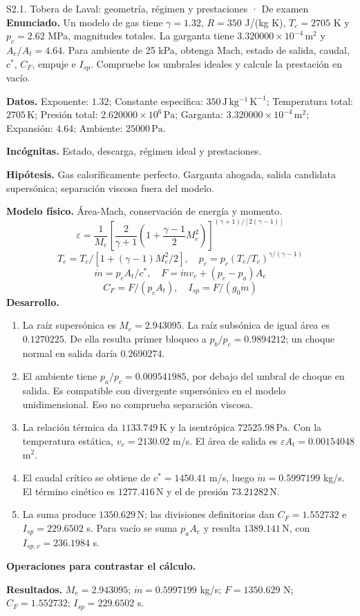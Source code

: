 \begin{studiumworked}{S2.1. Tobera de Laval: geometría, régimen y prestaciones · De examen}
\textbf{Enunciado.} Un modelo de gas tiene $\gamma=1.32$, $R=350$ J/(kg K), $T_c=2705$ K y $p_c=2.62$ MPa, magnitudes totales. La garganta tiene $3.320000\times10^{-4}\,\mathrm{m^2}$ y $A_e/A_t=4.64$. Para ambiente de 25 kPa, obtenga Mach, estado de salida, caudal, $c^*$, $C_F$, empuje e $I_{sp}$. Compruebe los umbrales ideales y calcule la prestación en vacío.

\textbf{Datos.} Exponente: $1.32$; Constante específica: $350\,\mathrm{J\,kg^{-1}\,K^{-1}}$; Temperatura total: $2705\,\mathrm{K}$; Presión total: $2.620000\times10^{6}\,\mathrm{Pa}$; Garganta: $3.320000\times10^{-4}\,\mathrm{m^2}$; Expansión: $4.64$; Ambiente: $25000\,\mathrm{Pa}$.

\textbf{Incógnitas.} Estado, descarga, régimen ideal y prestaciones.

\textbf{Hipótesis.} Gas caloríficamente perfecto. Garganta ahogada, salida candidata supersónica; separación viscosa fuera del modelo.

\textbf{Modelo físico.} Área-Mach, conservación de energía y momento.
\[\varepsilon=\frac1{M_e}\left[\frac2{\gamma+1}(1+\frac{\gamma-1}2M_e^2)\right]^{(\gamma+1)/[2(\gamma-1)]}\]
\[T_e=T_c/[1+(\gamma-1)M_e^2/2],\quad p_e=p_c(T_e/T_c)^{\gamma/(\gamma-1)}\]
\[\dot m=p_cA_t/c^*,\quad F=\dot m v_e+(p_e-p_a)A_e\]
\[C_F=F/(p_cA_t),\quad I_{sp}=F/(g_0\dot m)\]
\textbf{Desarrollo.}
\begin{enumerate}
\item La raíz supersónica es $M_e=2.943095$. La raíz subsónica de igual área es $0.1270225$. De ella resulta primer bloqueo a $p_b/p_c=0.9894212$; un choque normal en salida daría $0.2690274$.
\item El ambiente tiene $p_a/p_c=0.009541985$, por debajo del umbral de choque en salida. Es compatible con divergente supersónico en el modelo unidimensional. Eso no comprueba separación viscosa.
\item La relación térmica da $1133.749\,\mathrm{K}$ y la isentrópica $72525.98\,\mathrm{Pa}$. Con la temperatura estática, $v_e=2130.02$ m/s. El área de salida es $\varepsilon A_t=0.00154048$ m$^2$.
\item El caudal crítico se obtiene de $c^*=1450.41$ m/s, luego $\dot m=0.5997199$ kg/s. El término cinético es $1277.416\,\mathrm{N}$ y el de presión $73.21282\,\mathrm{N}$.
\item La suma produce $1350.629\,\mathrm{N}$; las divisiones definitorias dan $C_F=1.552732$ e $I_{sp}=229.6502$ s. Para vacío se suma $p_aA_e$ y resulta $1389.141\,\mathrm{N}$, con $I_{sp,v}=236.1984$ s.
\end{enumerate}
\textbf{Operaciones para contrastar el cálculo.}

\textbf{Resultados.} $M_e=2.943095$; $\dot m=0.5997199$ kg/s; $F=1350.629$ N; $C_F=1.552732$; $I_{sp}=229.6502$ s.


\end{studiumworked}
